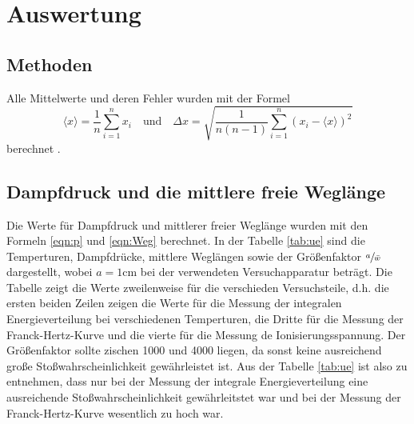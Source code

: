 \section{Auswertung}
\label{sec:Auswertung}


\subsection{Methoden}
Alle Mittelwerte und deren Fehler wurden mit der Formel
\begin{equation}
  \langle x \rangle = \frac{1}{n} \sum_{i=1} ^{n} x_i \quad \text{und} \quad
  \Delta x = \sqrt{\frac{1}{n(n-1)} \sum_{i=1}^n (x_i - \langle x \rangle )^2}
  \label{eqn:MW}
\end{equation}
berechnet \cite{Tipler}.
\subsection{Dampfdruck und die mittlere freie Weglänge}
Die Werte für Dampfdruck und mittlerer freier Weglänge wurden mit den Formeln
\eqref{eqn:p} und \eqref{eqn:Weg} berechnet.
In der Tabelle \ref{tab:ue} sind die Temperturen, Dampfdrücke, mittlere Weglängen
sowie der Größenfaktor $ \sfrac{a}{\bar{w}}$ dargestellt, wobei $a = 1 \si{\centi \meter}$ bei
der verwendeten Versuchapparatur beträgt. Die Tabelle zeigt die Werte zweilenweise für
die verschieden Versuchsteile, d.h. die ersten beiden Zeilen zeigen die Werte für
die Messung der integralen Energieverteilung bei verschiedenen Temperturen, die Dritte
für die Messung der Franck-Hertz-Kurve und die vierte für die Messung de Ionisierungsspannung.
Der Größenfaktor sollte zischen 1000 und
4000 liegen, da sonst keine ausreichend große Stoßwahrscheinlichkeit gewährleistet ist.
Aus der Tabelle \ref{tab:ue} ist also zu entnehmen, dass nur bei der Messung
der integrale Energieverteilung eine ausreichende
Stoßwahrscheinlichkeit gewährleitstet war und bei der Messung der Franck-Hertz-Kurve
wesentlich zu hoch war.

